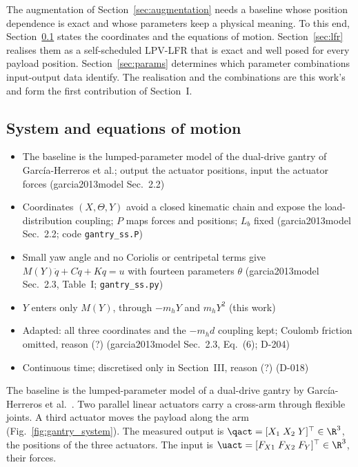 The augmentation of Section~\ref{sec:augmentation} needs a baseline whose
position dependence is exact and whose parameters keep a physical meaning.
To this end, Section~\ref{sec:sys} states the coordinates and the equations of
motion.
Section~\ref{sec:lfr} realises them as a self-scheduled LPV-LFR that is exact
and well posed for every payload position.
Section~\ref{sec:params} determines which parameter combinations input-output
data identify.
The realisation and the combinations are this work's and form the first
contribution of Section~I.

\subsection{System and equations of motion}\label{sec:sys}
\ifdraft
\begin{itemize}
\item The baseline is the lumped-parameter model of the dual-drive gantry of Garc\'ia-Herreros et al.; output the actuator positions, input the actuator forces (garcia2013model Sec.~2.2)
\item Coordinates $(X,\Theta,Y)$ avoid a closed kinematic chain and expose the load-distribution coupling; $P$ maps forces and positions; $L_b$ fixed (garcia2013model Sec.~2.2; code \texttt{gantry\_ss.P})
\item Small yaw angle and no Coriolis or centripetal terms give $M(Y)\ddot q+C\dot q+Kq=u$ with fourteen parameters $\theta$ (garcia2013model Sec.~2.3, Table~I; \texttt{gantry\_ss.py})
\item $Y$ enters only $M(Y)$, through $-m_hY$ and $m_hY^2$ (this work)
\item Adapted: all three coordinates and the $-m_hd$ coupling kept; Coulomb friction omitted, reason (?) (garcia2013model Sec.~2.3, Eq.~(6); D-204)
\item Continuous time; discretised only in Section~III, reason (?) (D-018)
\end{itemize}
\fi
The baseline is the lumped-parameter model of a dual-drive gantry by
Garc\'ia-Herreros et al.~\cite{garcia2013model}.
Two parallel linear actuators carry a cross-arm through flexible joints.
A third actuator moves the payload along the arm (Fig.~\ref{fig:gantry_system}).
The measured output is $\qact=[X_1\;X_2\;Y]^\top\in\R^3$, the positions of the
three actuators.
The input is $\uact=[F_{X1}\;F_{X2}\;F_Y]^\top\in\R^3$, their forces.

